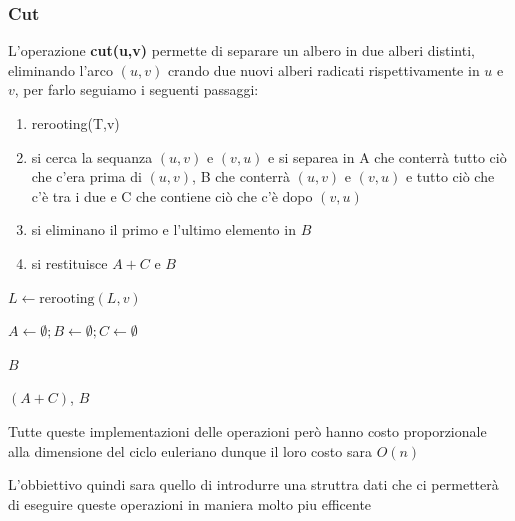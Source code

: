 \subsubsection{Cut}
L'operazione \textbf{cut(u,v)} permette di separare un albero in due alberi distinti, eliminando l'arco $(u,v)$ crando due nuovi alberi radicati rispettivamente in $u$ e $v$, per farlo seguiamo i seguenti passaggi:
\begin{enumerate}
    \item rerooting(T,v)
    \item si cerca la sequanza $(u,v)$ e $(v,u)$ e si separea in A che conterrà tutto ciò che c'era prima di $(u,v)$, B che conterrà $(u,v)$ e $(v,u)$ e tutto ciò che c'è tra i due e C che contiene ciò che c'è dopo $(v,u)$
    \item si eliminano il primo e l'ultimo elemento in $B$
    \item si restituisce $A + C$ e $B$
\end{enumerate}

\begin{algorithm}[H]
    \caption{Cut}
    \label{alg:cut}
    \SetAlgoLined
    \DontPrintSemicolon
    
    
    \BlankLine 

    $L \leftarrow \text{rerooting}(L, v)$\;
    
    $A \leftarrow \emptyset; B \leftarrow \emptyset; C \leftarrow \emptyset$\;
    








     $B$\;

    \Return $(A + C)$, $B$ 
\end{algorithm}

 \begin{remark}
    Tutte queste implementazioni delle operazioni però hanno costo proporzionale alla dimensione del ciclo euleriano dunque il loro costo sara $O(n)$
 \end{remark}

L'obbiettivo quindi sara quello di introdurre una struttra dati che ci permetterà di eseguire queste operazioni in maniera molto piu efficente
